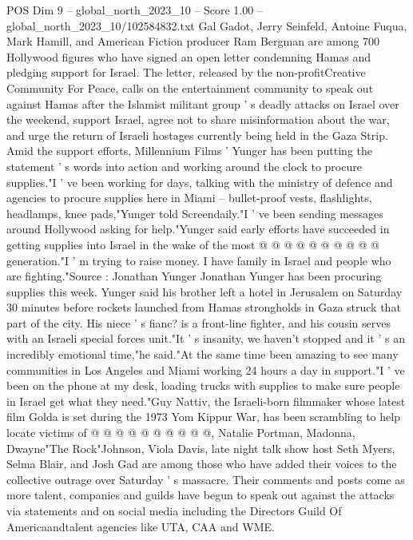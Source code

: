 \begin{textsample}{POS Dim 9 – global\_north\_2023\_10 – Score 1.00 – global\_north\_2023\_10/102584832.txt}  \label{ex:f9_pos_305}
Gal Gadot, Jerry Seinfeld, Antoine Fuqua, Mark Hamill, and American Fiction producer Ram Bergman are among 700 Hollywood figures who have signed an open letter condemning Hamas and pledging support for Israel.
The letter, released by the non-profitCreative Community For Peace, calls on the entertainment community to speak out against Hamas after the Islamist militant group ' s deadly attacks on Israel over the weekend, support Israel, agree not to share misinformation about the war, and urge the return of Israeli hostages currently being held in the Gaza Strip.
Amid the support efforts, Millennium Films ' Yunger has been putting the statement ' s words into action and working around the clock to procure supplies."I ' ve been working for days, talking with the ministry of defence and agencies to procure supplies here in Miami -- bullet-proof vests, flashlights, headlamps, knee pads,"Yunger told Screendaily."I ' ve been sending messages around Hollywood asking for help."Yunger said early efforts have succeeded in getting supplies into Israel in the wake of the most @ @ @ @ @ @ @ @ @ @ generation."I ' m trying to raise money.
I have family in Israel and people who are fighting."Source : Jonathan Yunger Jonathan Yunger has been procuring supplies this week.
Yunger said his brother left a hotel in Jerusalem on Saturday 30 minutes before rockets launched from Hamas strongholds in Gaza struck that part of the city.
His niece ' s fianc? is a front-line fighter, and his cousin serves with an Israeli special forces unit."It ' s insanity, we haven't stopped and it ' s an incredibly emotional time,"he said."At the same time been amazing to see many communities in Los Angeles and Miami working 24 hours a day in support."I ' ve been on the phone at my desk, loading trucks with supplies to make sure people in Israel get what they need."Guy Nattiv, the Israeli-born filmmaker whose latest film Golda is set during the 1973 Yom Kippur War, has been scrambling to help locate victims of @ @ @ @ @ @ @ @ @ @, Natalie Portman, Madonna, Dwayne"The Rock"Johnson, Viola Davis, late night talk show host Seth Myers, Selma Blair, and Josh Gad are among those who have added their voices to the collective outrage over Saturday ' s massacre.
Their comments and posts come as more talent, companies and guilds have begun to speak out against the attacks via statements and on social media including the Directors Guild Of Americaandtalent agencies like UTA, CAA and WME.

\end{textsample}
